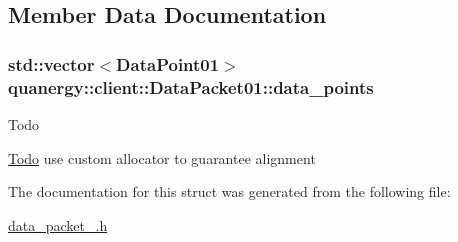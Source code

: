 \subsection{Member Data Documentation}
\hypertarget{structquanergy_1_1client_1_1DataPacket01_a399433c3f9f58954e5b7c9dd10c0232a}{
\subsubsection[{data\-\_\-points}]{\setlength{\rightskip}{0pt plus 5cm}std\-::vector$<${\bf Data\-Point01}$>$ quanergy\-::client\-::\-Data\-Packet01\-::data\-\_\-points}}\label{structquanergy_1_1client_1_1DataPacket01_a399433c3f9f58954e5b7c9dd10c0232a}
\begin{DoxyRefDesc}{Todo}
\item[\hyperlink{todo__todo000001}{Todo}]use custom allocator to guarantee alignment \end{DoxyRefDesc}


The documentation for this struct was generated from the following file\-:\begin{DoxyCompactItemize}
\item 
\hyperlink{data__packet__01_8h}{data\-\_\-packet\-\_.\-h}\end{DoxyCompactItemize}
